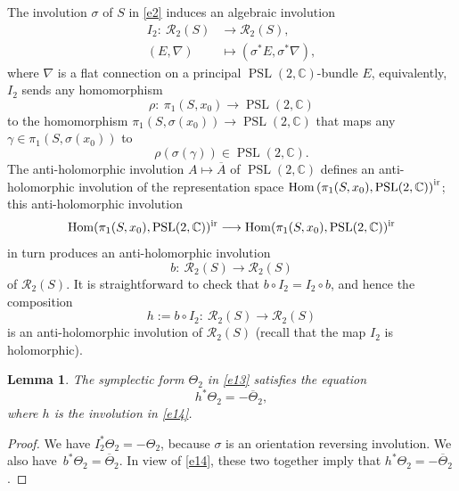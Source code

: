 \documentclass[10pt,a4paper]{amsart}
\numberwithin{equation}{section}
\newtheorem{Lemma}[Theorem]{Lemma}
\begin{document}
The involution $\sigma$ of $S$ in \eqref{e2} induces an algebraic involution
\begin{align*}
I_2\colon\ {\mathcal R}_2(S) &\longrightarrow {\mathcal R}_2(S), \\
(E, \nabla)&\longmapsto (\sigma^*E, \sigma^*{\nabla}),
\end{align*}
where $\nabla$ is a flat connection on a principal $\operatorname{PSL}(2,{\mathbb C})$-bundle $E$,
equivalently, $I_2$ sends any homomorphism
\[
\rho\colon\
\pi_1(S, x_0) \longrightarrow \operatorname{PSL}(2, {\mathbb C})
\]
 to the homomorphism
$\pi_1(S, \sigma(x_0)) \longrightarrow \operatorname{PSL}(2,{\mathbb C})$ that maps any
$\gamma \in \pi_1(S, \sigma(x_0))$ to
\[
\rho(\sigma(\gamma))
\in \operatorname{PSL}(2,{\mathbb C}).\]
The anti-holomorphic involution $A \longmapsto \overline{A}$
of $\operatorname{PSL}(2,{\mathbb C})$ defines an anti-holomorphic involution of the representation space
$\operatorname{Hom}\left(\pi_1(S, x_0), \operatorname{PSL}(2,{\mathbb C})\right)^{\rm ir}$; this anti-holomorphic involution
\[
\operatorname{Hom}(\pi_1(S, x_0), \operatorname{PSL}(2,{\mathbb C}))^{\rm ir} \longrightarrow
 \operatorname{Hom}(\pi_1(S, x_0), \operatorname{PSL}(2,{\mathbb C}))^{\rm ir}
 \] in turn produces an
anti-holomorphic involution
\begin{equation}\label{eb}
b\colon\ {\mathcal R}_2(S) \longrightarrow {\mathcal R}_2(S)
\end{equation}
of ${\mathcal R}_2(S)$. It is straightforward to check that $b\circ I_2 = I_2\circ b$,
and hence the composition
\begin{equation}\label{e14}
h := b\circ I_2\colon\ {\mathcal R}_2(S) \longrightarrow {\mathcal R}_2(S)
\end{equation}
is an anti-holomorphic involution of ${\mathcal R}_2(S)$ (recall that the map $I_2$
is holomorphic).

\begin{Lemma}\label{lem1}
The symplectic form $\Theta_2$ in \eqref{e13} satisfies the equation
\[
h^*\Theta_2 = -\overline{\Theta}_2,
\]
where $h$ is the involution in \eqref{e14}.
\end{Lemma}

\begin{proof}
We have $I^*_2\Theta_2 = -\Theta_2$, because $\sigma$ is an orientation reversing involution.
We also have~$b^*\Theta_2 = \overline{\Theta}_2$. In view of
\eqref{e14}, these two together
imply that $h^*\Theta_2 = -\overline{\Theta}_2$.
\end{proof}
\end{document}
